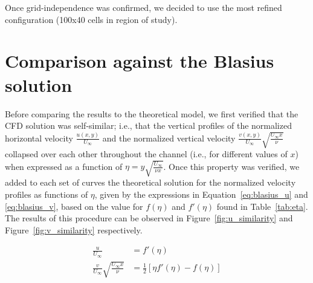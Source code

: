 \documentclass[12pt]{article}
\begin{document}
        Once grid-independence was confirmed, we decided to use the most refined configuration (100x40 cells in region of study).

\section{Comparison against the Blasius solution} \label{sec:comparison}

        Before comparing the results to the theoretical model, we first verified that the CFD solution was self-similar; i.e., that the vertical profiles of the normalized horizontal velocity $ \frac{u(x,y)}{U_\infty} $ and the normalized vertical velocity $ \frac{v(x,y)}{U_\infty} \sqrt{\frac{U_\infty x}{\nu}} $ collapsed over each other throughout the channel (i.e., for different values of \( x \)) when expressed as a function of $ \eta = y \sqrt{\frac{U_\infty}{\nu x}} $. Once this property was verified, we added to each set of curves the theoretical solution for the normalized velocity profiles as functions of $ \eta $, given by the expressions in Equation~\ref{eq:blasius_u} and \ref{eq:blasius_v}, based on the value for \( f(\eta) \) and \( f'(\eta) \) found in Table~\ref{tab:eta}. The results of this procedure can be observed in Figure~\ref{fig:u_similarity} and Figure~\ref{fig:v_similarity} respectively.

        \begin{align}
                \label{eq:blasius_u}
                \frac{u}{U_\infty} & = f'(\eta) \\
                \label{eq:blasius_v}
                \frac{v}{U_\infty} \sqrt{\frac{U_\infty x}{\nu}} & = \frac{1}{2} [\eta f'(\eta) - f(\eta)]
        \end{align}
\end{document}
